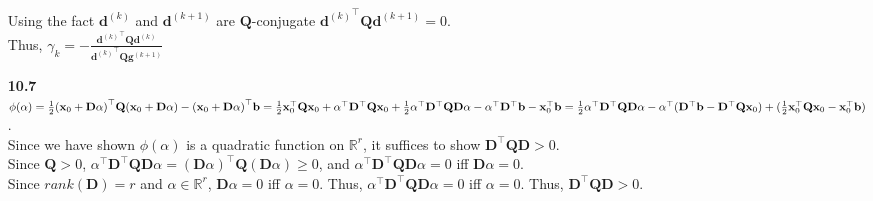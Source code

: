 \documentclass[10pt]{article}
\begin{document}
\begin{enumerate}
    Using the fact $\mathbf{d}^{(k)}$ and $\mathbf{d}^{(k+1)}$ are $\mathbf{Q}$-conjugate ${\mathbf{d}^{(k)}}^\top\mathbf{Q}\mathbf{d}^{(k+1)}=0$.\\
    Thus, $\gamma_k=-\frac{{\mathbf{d}^{(k)}}^\top\mathbf{Q}\mathbf{d}^{(k)}}{{\mathbf{d}^{(k)}}^\top\mathbf{Q}\mathbf{g}^{(k+1)}}$
    \item [\textbf{10.7}] $\phi(\alpha)=\frac{1}{2}{(\mathbf{x}_0+\mathbf{D}\alpha)}^\top\mathbf{Q}(\mathbf{x}_0+\mathbf{D}\alpha)-{(\mathbf{x}_0+\mathbf{D}\alpha)}^\top\mathbf{b}\\
    =\frac{1}{2}\mathbf{x}_0^\top\mathbf{Q}\mathbf{x}_0+\alpha^\top\mathbf{D}^\top\mathbf{Q}\mathbf{x}_0+\frac{1}{2}\alpha^\top\mathbf{D}^\top\mathbf{Q}\mathbf{D}\alpha-\alpha^\top\mathbf{D}^\top\mathbf{b}-\mathbf{x}_0^\top\mathbf{b}\\
    =\frac{1}{2}\alpha^\top\mathbf{D}^\top\mathbf{Q}\mathbf{D}\alpha-\alpha^\top(\mathbf{D}^\top\mathbf{b}-\mathbf{D}^\top\mathbf{Q}\mathbf{x}_0)+(\frac{1}{2}\mathbf{x}_0^\top\mathbf{Q}\mathbf{x}_0-\mathbf{x}_0^\top\mathbf{b})$.\\
    Since we have shown $\phi(\alpha)$ is a quadratic function on $\mathbb{R}^r$, it suffices to show $\mathbf{D}^\top\mathbf{Q}\mathbf{D}>0$.\\
    Since $\mathbf{Q}>0$, $\alpha^\top\mathbf{D}^\top\mathbf{Q}\mathbf{D}\alpha={(\mathbf{D}\alpha)}^\top\mathbf{Q}(\mathbf{D}\alpha)\ge0$, and $\alpha^\top\mathbf{D}^\top\mathbf{Q}\mathbf{D}\alpha=0$ iff $\mathbf{D}\alpha=0$.\\
    Since $rank(\mathbf{D})=r$ and $\alpha\in\mathbb{R}^r$, $\mathbf{D}\alpha=0$ iff $\alpha=0$. Thus, $\alpha^\top\mathbf{D}^\top\mathbf{Q}\mathbf{D}\alpha=0$ iff $\alpha=0$.
    Thus, $\mathbf{D}^\top\mathbf{Q}\mathbf{D}>0$.
\end{enumerate}
\end{document}
